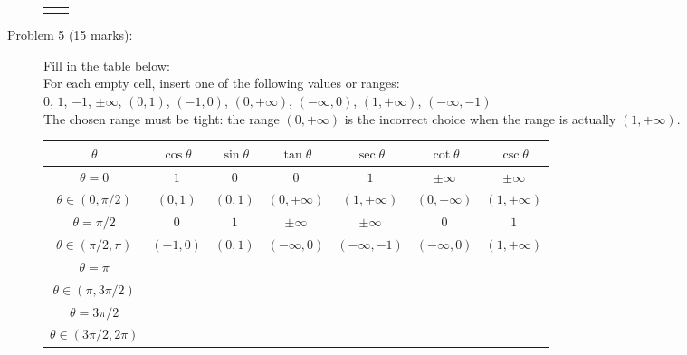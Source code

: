 \documentclass{article}
\begin{document}
\begin{description}
\begin{tabular}{cc}
{}
\end{tabular}
\item[Problem 5 (15 marks):] Fill in the table below: \\
For each empty cell, insert one of the following values or ranges: \\
\(0\), \(1\), \(-1\), \(\pm\infty\), \((0, 1)\), \((-1, 0)\), \((0, +\infty)\), \((-\infty, 0)\), \((1, +\infty)\), \((-\infty, -1)\) \\
The chosen range must be tight: the range \((0, +\infty)\) is the incorrect choice when the range is actually \((1, +\infty)\). \\
\begin{tabular}{|c||c|c||c|c||c|c|}
\hline
\(\theta\)                            & \(\cos\theta\) & \(\sin\theta\) &  \(\tan\theta\) & \(\sec\theta\) &  \(\cot\theta\) &  \(\csc\theta\) \\
\hline
\hline
\(\theta = 0\)                      &              \(1\) &               \(0\) &                \(0\) &                \(1\) &    \(\pm\infty\) &     \(\pm\infty\) \\
\hline
\(\theta \in (0, \pi/2)\)        &         \((0,1)\) &         \((0,1)\) & \((0,+\infty)\) & \((1,+\infty)\) & \((0,+\infty)\) & \((1,+\infty)\) \\
\hline
\(\theta = \pi/2\)                &               \(0\) &               \(1\) &    \(\pm\infty\) &    \(\pm\infty\) &                \(0\) &                 \(1\) \\
\hline
\(\theta \in (\pi/2, \pi)\)     &        \((-1,0)\) &        \((0,1)\) &  \((-\infty, 0)\) & \((-\infty, -1)\) & \((-\infty,0)\) & \((1,+\infty)\) \\
\hline
\(\theta = \pi\)                  &                        &                       &                         &                          &                       &                         \\
\hline
\(\theta \in (\pi, 3\pi/2)\)  &                        &                       &                         &                          &                       &                         \\
\hline
\(\theta = 3\pi/2\)             &                       &                       &                         &                          &                       &                         \\
\hline
\(\theta \in (3\pi/2, 2\pi)\) &                       &                       &                         &                          &                       &                         \\

\end{tabular}
\end{description}
\end{document}
